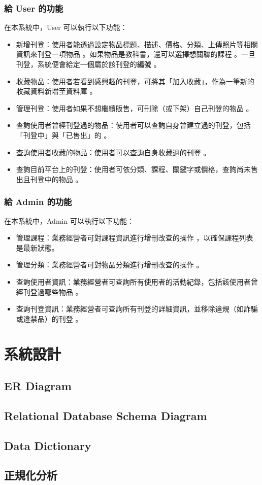 \documentclass[a4paper]{article}
\begin{document}
\subsubsection{給 User 的功能}
在本系統中，User 可以執行以下功能：
\begin{itemize}
    \item 新增刊登：使用者能透過設定物品標題、描述、價格、分類、上傳照片等相關資訊來刊登一項物品 。如果物品是教科書，還可以選擇想關聯的課程 。一旦刊登，系統便會給定一個屬於該刊登的編號 。
    \item 收藏物品：使用者若看到感興趣的刊登，可將其「加入收藏」，作為一筆新的收藏資料新增至資料庫 。
    \item 管理刊登：使用者如果不想繼續販售，可刪除（或下架）自己刊登的物品 。
    \item 查詢使用者曾經刊登過的物品：使用者可以查詢自身曾建立過的刊登，包括「刊登中」與「已售出」的 。
    \item 查詢使用者收藏的物品：使用者可以查詢自身收藏過的刊登 。
    \item 查詢目前平台上的刊登：使用者可依分類、課程、關鍵字或價格，查詢尚未售出且刊登中的物品 。
\end{itemize}

\subsubsection{給 Admin 的功能}
在本系統中，Admin 可以執行以下功能：
\begin{itemize}
    \item 管理課程：業務經營者可對課程資訊進行增刪改查的操作 ，以確保課程列表是最新狀態。
    \item 管理分類：業務經營者可對物品分類進行增刪改查的操作 。
    \item 查詢使用者資訊：業務經營者可查詢所有使用者的活動紀錄，包括該使用者曾經刊登過哪些物品 。
    \item 查詢刊登資訊：業務經營者可查詢所有刊登的詳細資訊，並移除違規（如詐騙或違禁品）的刊登 。
\end{itemize}

\section{系統設計}
\subsection{ER Diagram}
\subsection{Relational Database Schema Diagram}
\subsection{Data Dictionary}
\subsection{正規化分析}
\end{document}
